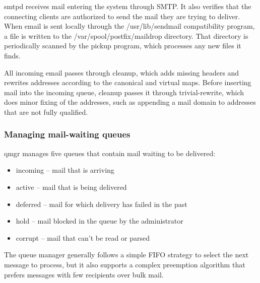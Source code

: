 \protect\hypertarget{part0026_split_058.htmlux5cux23_idIndexMarker2684}{}{}\protect\hypertarget{part0026_split_058.htmlux5cux23_idIndexMarker2685}{}{}{smtpd}
receives mail entering the system through SMTP. It also verifies that
the connecting clients are authorized to send the mail they are trying
to deliver. When email is sent locally through the {/usr/lib/sendmail}
compatibility program, a file is written to the
\protect\hypertarget{part0026_split_058.htmlux5cux23_idIndexMarker2686}{}{}{/var/spool/postfix/maildrop}
directory. That directory is periodically scanned by the
\protect\hypertarget{part0026_split_058.htmlux5cux23_idIndexMarker2687}{}{}{pickup}
program, which processes any new files it finds.

All incoming email passes through
\protect\hypertarget{part0026_split_058.htmlux5cux23_idIndexMarker2688}{}{}{cleanup},
which adds missing headers and rewrites addresses according to the
{canonical} and {virtual} maps. Before inserting mail into the
{incoming} queue, {cleanup} passes it through {trivial-rewrite}, which
does minor fixing of the addresses, such as appending a mail domain to
addresses that are not fully qualified.

\subsubsection[Managing mail-waiting
queues]{\texorpdfstring{\protect\hypertarget{part0026_split_058.htmlux5cux23_idTextAnchor1168}{}{}Managing
mail-waiting queues}{Managing mail-waiting queues}}

\protect\hypertarget{part0026_split_058.htmlux5cux23_idIndexMarker2689}{}{}\protect\hypertarget{part0026_split_058.htmlux5cux23_idIndexMarker2690}{}{}{qmgr}
manages five queues that contain mail waiting to be delivered:

\begin{itemize}
\item
  {incoming} -- mail that is arriving
\item
  {active} -- mail that is being delivered
\item
  {deferred} -- mail for which delivery has failed in the past
\item
  {hold} -- mail blocked in the queue by the administrator
\item
  {corrupt} -- mail that can't be read or parsed
\end{itemize}

The queue manager generally follows a simple FIFO strategy to select the
next message to process, but it also supports a complex preemption
algorithm that prefers messages with few recipients over bulk mail.

